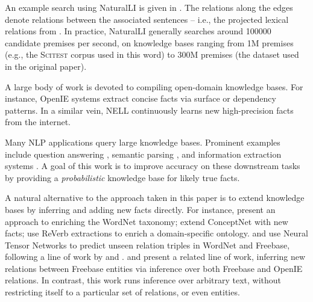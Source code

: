 An example search using NaturalLI is given in .
The relations along the edges denote relations between the associated sentences
  -- i.e., the projected lexical relations from .
In practice, NaturalLI generally searches around \num{100000} candidate premises
  per second, on knowledge bases ranging from 1M premises (e.g., the \textsc{Scitest}
  corpus used in this word) to 300M premises (the dataset used in the original paper).

%
%
A large body of work is devoted to compiling open-domain knowledge
  bases.
For instance, OpenIE systems
  \cite{key:2007yates-textrunner,key:2011fader-reverb}
  extract concise facts via surface or dependency patterns.
In a similar vein, NELL \cite{key:2010carlson-nell,key:2013gardnerpra-nell}
  continuously learns new high-precision facts from the internet.

Many NLP applications query large knowledge bases.
Prominent examples include
  question answering
    \cite{key:2001voorhees-trec},
  semantic parsing
    \cite{key:1996zelle-semantics,key:2007zettlemoyer-semantics,key:2013kwiatkowski-semantics,key:2014berant-semantics},
  and information extraction systems
    \cite{key:2011hoffman-kbp,key:2012surdeanu-mimlre}.
A goal of this work is to improve accuracy on these
  downstream tasks by providing a \textit{probabilistic} knowledge base
  for
  likely true facts.

A natural alternative to the approach taken in this paper is to
  extend knowledge bases by inferring and adding new facts directly.
For instance,
   present an approach to enriching 
    the WordNet taxonomy;
   extend ConceptNet with new facts;
   use ReVerb extractions to 
    enrich a domain-specific ontology.
 and 
  use Neural Tensor Networks to predict unseen relation triples in
  WordNet and Freebase, following a line of work by
   and
  .
 and 
  present a related line of work, inferring new relations between
  Freebase entities via inference over both Freebase and
  OpenIE relations.
In contrast, this work runs inference over arbitrary text, without 
  restricting itself to a particular set of relations, or even entities.


